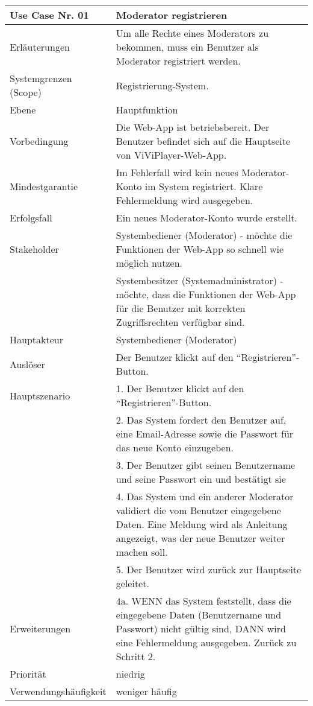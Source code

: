 \begin{tabularx}{\linewidth}{|l|X|}
	\hline
	Use Case Nr. 01			& \textbf{Moderator registrieren} \\ \hline
	Erläuterungen			& Um alle Rechte eines Moderators zu bekommen, muss ein 
							Benutzer als Moderator registriert werden. \\ \hline
	Systemgrenzen (Scope)	& Registrierung-System. \\ \hline
	Ebene					& Hauptfunktion \\ \hline
	Vorbedingung			& Die Web-App ist betriebsbereit. Der Benutzer befindet sich auf die 
							  Hauptseite von ViViPlayer-Web-App. \\ \hline
	Mindestgarantie			& Im Fehlerfall wird kein neues Moderator-Konto im System 
	                          registriert. Klare Fehlermeldung wird ausgegeben. \\ \hline
	Erfolgsfall  			& Ein neues Moderator-Konto wurde erstellt. \\ \hline
	Stakeholder				& Systembediener (Moderator) - möchte die Funktionen der Web-App so 
							  schnell wie möglich nutzen. \\
							& Systembesitzer (Systemadministrator) - möchte, dass die Funktionen 
							  der Web-App für die Benutzer mit korrekten Zugriffsrechten verfügbar sind.\\ \hline
	Hauptakteur				& Systembediener (Moderator) \\ \hline
	Auslöser				& Der Benutzer klickt auf den ``Registrieren''-Button. \\ \hline	
	Hauptszenario			& 1. Der Benutzer klickt auf den ``Registrieren''-Button. \\
							& 2. Das System fordert den Benutzer auf, eine Email-Adresse 
							  sowie die Passwort für das neue Konto einzugeben. \\
							& 3. Der Benutzer gibt seinen Benutzername und seine Passwort 
							  ein und bestätigt sie \\
							& 4. Das System und ein anderer Moderator validiert die vom 
							  Benutzer eingegebene Daten. Eine Meldung wird als 
							  Anleitung angezeigt, was der neue Benutzer weiter machen soll. \\
							& 5. Der Benutzer wird zurück zur Hauptseite geleitet. 
							  \\ \hline
	Erweiterungen			& 4a. WENN das System feststellt, dass die eingegebene Daten 
							  (Benutzername und Passwort) nicht gültig sind, DANN wird eine Fehlermeldung ausgegeben. Zurück zu Schritt 2. \\ \hline
	Priorität				& niedrig \\ \hline
	Verwendungshäufigkeit	& weniger häufig \\ \hline
\end{tabularx}
